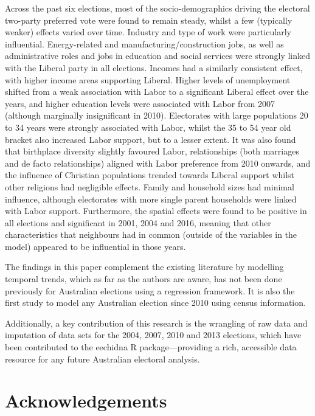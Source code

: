 \documentclass[
  times, doublespace]{anzsauth}
\begin{document}
Across the past six elections, most of the socio-demographics driving the electoral two-party preferred vote were found to remain steady, whilst a few (typically weaker) effects varied over time. Industry and type of work were particularly influential. Energy-related and manufacturing/construction jobs, as well as administrative roles and jobs in education and social services were strongly linked with the Liberal party in all elections. Incomes had a similarly consistent effect, with higher income areas supporting Liberal. Higher levels of unemployment shifted from a weak association with Labor to a significant Liberal effect over the years, and higher education levels were associated with Labor from 2007 (although marginally insignificant in 2010). Electorates with large populations 20 to 34 years were strongly associated with Labor, whilst the 35 to 54 year old bracket also increased Labor support, but to a lesser extent. It was also found that birthplace diversity slightly favoured Labor, relationships (both marriages and de facto relationships) aligned with Labor preference from 2010 onwards, and the influence of Christian populations trended towards Liberal support whilst other religions had negligible effects. Family and household sizes had minimal influence, although electorates with more single parent households were linked with Labor support. Furthermore, the spatial effects were found to be positive in all elections and significant in 2001, 2004 and 2016, meaning that other characteristics that neighbours had in common (outside of the variables in the model) appeared to be influential in those years.

The findings in this paper complement the existing literature by modelling temporal trends, which as far as the authors are aware, has not been done previously for Australian elections using a regression framework. It is also the first study to model any Australian election since 2010 using census information.

Additionally, a key contribution of this research is the wrangling of raw data and imputation of data sets for the 2004, 2007, 2010 and 2013 elections, which have been contributed to the \textsf{eechidna} \textsf{R} package---providing a rich, accessible data resource for any future Australian electoral analysis.

\hypertarget{acknowledgements}{%
\section{Acknowledgements}\label{acknowledgements}}
\end{document}
